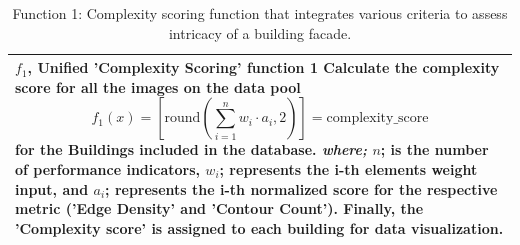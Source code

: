 \documentclass[final,5p,times]{elsarticle}
\begin{document}
\begin{table}[htb]
    \centering
    \caption{Function 1: Complexity scoring function that integrates various criteria to assess intricacy of a building facade.}
    \label{tab:ComplexityScoreFunction_table}
    \begin{tabularx}{\textwidth}{|X|}%
    \hline
    \small
    \textbf{\(f_1\), Unified 'Complexity Scoring' function 1}
    \newline
    Calculate the complexity score for all the images on the data pool
    \begin{equation}
        f_1(x) = \left[ \mathrm{round}\left(\sum_{i=1}^{n} w_i \cdot a_i, 2\right) \right] = \text{complexity\_score}
    \label{eq:F1_ComplexityScoreFunction}
    \end{equation}
    for the Buildings included in the database.
    \newline
    \textit{where;}
    \newline
    \(n \); is the number of performance indicators,
    \newline
    \(w_i \); represents the i-th elements weight input, and
    \newline
    \(a_i \); represents the i-th normalized score for the respective metric ('Edge Density' and 'Contour Count').
    \newline
    Finally, the 'Complexity score' is assigned to each building for data visualization.
    \\
    \hline
    \end{tabularx}
\end{table}
\end{document}
